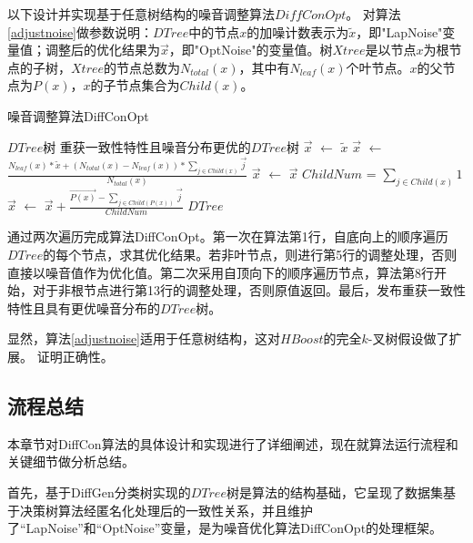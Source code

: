 以下设计并实现基于任意树结构的噪音调整算法$DiffConOpt$。
对算法\ref{adjustnoise}做参数说明：$DTree$中的节点$x$的加噪计数表示为$\tilde{x}$，即"LapNoise"变量值；调整后的优化结果为$\vec{x}$，即"OptNoise"的变量值。树$Xtree$是以节点$x$为根节点的子树，$Xtree$的节点总数为$N_{total}(x)$，其中有$N_{leaf}(x)$个叶节点。$x$的父节点为$P(x)$，$x$的子节点集合为$Child(x)$。
\begin{algorithm}
	\caption{噪音调整算法DiffConOpt} 
	\label{adjustnoise}
	\begin{algorithmic}[1]
		\REQUIRE $DTree$树
		\ENSURE 重获一致性特性且噪音分布更优的$DTree$树
		\STATE $\vec{x}$ $\leftarrow$ $\tilde{x}$ 
		\ELSE
		\STATE  $\vec{x}$ $\leftarrow$ $\frac{{N_{leaf}(x) * \tilde{x} + (N_{total}(x) - N_{leaf}(x)) * \sum\nolimits_{j \in Child(x)} {\vec{j}}}}{{N_{total}(x)}}$
		\ENDIF
		\ENDFOR
		\STATE  $\vec{x}$ $\leftarrow$ $\vec{x}$
		\ELSE
		\STATE  $ChildNum$ = ${\sum\nolimits_{j \in Child(x)} {1}}$
		\STATE  $\vec{x}$ $\leftarrow$ $\vec{x} + \frac{{\overrightarrow{P(x)} - \sum\nolimits_{j \in Child(P(x))} {\vec{j}}}}{ChildNum}$
		\ENDIF
		\ENDFOR
		\RETURN $DTree$
	\end{algorithmic}
\end{algorithm}

通过两次遍历完成算法DiffConOpt。第一次在算法第1行，自底向上的顺序遍历$DTree$的每个节点，求其优化结果。若非叶节点，则进行第5行的调整处理，否则直接以噪音值作为优化值。第二次采用自顶向下的顺序遍历节点，算法第8行开始，对于非根节点进行第13行的调整处理，否则原值返回。最后，发布重获一致性特性且具有更优噪音分布的$DTree$树。

显然，算法\ref{adjustnoise}适用于任意树结构，这对$HBoost$的完全$k$-叉树假设做了扩展。
证明正确性。


\subsection{流程总结}

本章节对DiffCon算法的具体设计和实现进行了详细阐述，现在就算法运行流程和关键细节做分析总结。

首先，基于DiffGen分类树实现的$DTree$树是算法的结构基础，它呈现了数据集基于决策树算法经匿名化处理后的一致性关系，并且维护了“LapNoise”和“OptNoise”变量，是为噪音优化算法DiffConOpt的处理框架。

